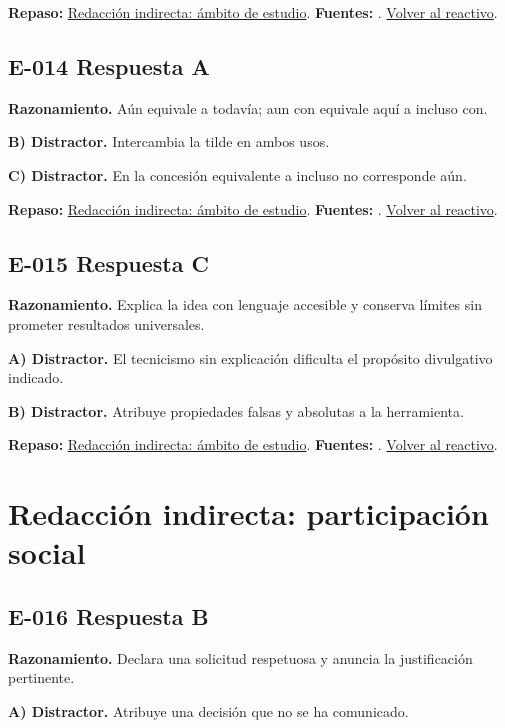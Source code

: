 \textbf{Repaso:} \hyperref[sec:e1]{Redacción indirecta: ámbito de estudio}. \textbf{Fuentes:} \cite{rae,writing}. \hyperref[q:E-013]{Volver al reactivo}.\par\medskip

\subsection*{E-014 \quad Respuesta A}\label{s:E-014}
\textbf{Razonamiento.} Aún equivale a todavía; aun con equivale aquí a incluso con.

\textbf{B) Distractor. }Intercambia la tilde en ambos usos.

\textbf{C) Distractor. }En la concesión equivalente a incluso no corresponde aún.

\textbf{Repaso:} \hyperref[sec:e1]{Redacción indirecta: ámbito de estudio}. \textbf{Fuentes:} \cite{rae,writing}. \hyperref[q:E-014]{Volver al reactivo}.\par\medskip

\subsection*{E-015 \quad Respuesta C}\label{s:E-015}
\textbf{Razonamiento.} Explica la idea con lenguaje accesible y conserva límites sin prometer resultados universales.

\textbf{A) Distractor. }El tecnicismo sin explicación dificulta el propósito divulgativo indicado.

\textbf{B) Distractor. }Atribuye propiedades falsas y absolutas a la herramienta.

\textbf{Repaso:} \hyperref[sec:e1]{Redacción indirecta: ámbito de estudio}. \textbf{Fuentes:} \cite{rae,writing}. \hyperref[q:E-015]{Volver al reactivo}.\par\medskip

\section{Redacción indirecta: participación social}

\subsection*{E-016 \quad Respuesta B}\label{s:E-016}
\textbf{Razonamiento.} Declara una solicitud respetuosa y anuncia la justificación pertinente.

\textbf{A) Distractor. }Atribuye una decisión que no se ha comunicado.

